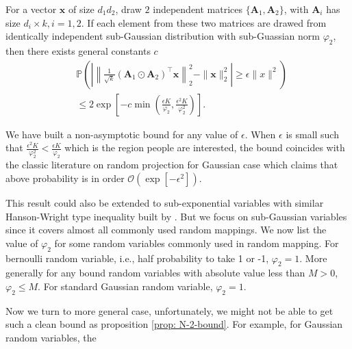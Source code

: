 \begin{prop}
\label{prop: N-2-bound}
For a vector $\mathbf{x}$ of size $d_1d_2$, draw $2$ independent matrices $\{\mathbf{A}_1, \mathbf{A}_2\}$, with $\mathbf{A}_i$ has size $d_i\times k, i=1,2$. If each element from these two matrices are drawed from identically independent sub-Gaussian distribution with sub-Guassian norm $\varphi_2$, then there exists general constants $c$ 
\begin{equation}
\begin{aligned}
\label{eq:lemma-invariant-length-statement}
&\mathbb{P}\left( \left|{ \left\|\frac{1}{\sqrt{k}}(\mathbf{A}_1 \odot \mathbf{A}_2)^\top \mathbf{x}\right\|^2_2} - \|\mathbf{x}\|^2_2 \right| \ge \epsilon \|x\|^2\right)\\
& \le 2\exp\left[-c \min\left(\frac{\epsilon K}{\varphi_2}, \frac{\epsilon^2 K}{\varphi_2^2}\right)\right].
\end{aligned}
\end{equation}
\end{prop}

\begin{remark}
We have built a non-asymptotic bound for any value of $\epsilon$. When $\epsilon$ is small such that $\frac{\epsilon^2 K}{\varphi_2^2}<\frac{\epsilon K}{\varphi_2}$ which is the region people are interested, the bound coincides with the classic literature on random projection for Gaussian case which claims that above probability is in order $\mathcal{O}(\exp[-\epsilon^2])$.
\end{remark}
\begin{remark}
This result could also be extended to sub-exponential variables with similar Hanson-Wright type inequality built by \cite{erdHos2012bulk}. But we focus on sub-Gaussian variables since it covers almost all commonly used random mappings. We now list the value of $\varphi_2$ for some random variables commonly used in random mapping. For bernoulli random variable, i.e., half probability to take 1 or -1,  $\varphi_2=1$. More generally for any bound random variables with absolute value less than $M>0$, $\varphi_2\le M$. For standard Gaussian random variable, $\varphi_2=1$. 
\end{remark}

Now we turn to more general case, unfortunately, we might not be able to get such a clean bound as proposition \ref{prop: N-2-bound}. For example, for Gaussian random variables, the 

